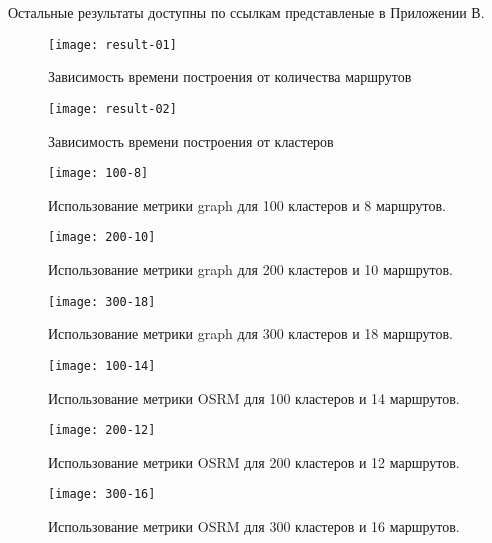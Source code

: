 Остальные результаты доступны по ссылкам представленые в Приложении В.

\begin{figure}[ht!]
    \centering
    \texttt{[image: result-01]}
    \caption{Зависимость времени построения от количества маршрутов}
    \label{fig:result-01}
\end{figure}

\begin{figure}[ht!]
    \centering
    \texttt{[image: result-02]}
    \caption{Зависимость времени построения от кластеров}
    \label{fig:result-02}
\end{figure}

\begin{figure}[ht!]
    \centering
    \texttt{[image: 100-8]}
    \caption{Использование метрики graph для 100 кластеров и 8 маршрутов.}
    \label{fig:network-01a}
\end{figure}

\begin{figure}[ht!]
    \centering
    \texttt{[image: 200-10]}
    \caption{Использование метрики graph для 200 кластеров и 10 маршрутов.}
    \label{fig:network-01b}
\end{figure}

\begin{figure}[ht!]
    \centering
    \texttt{[image: 300-18]}
    \caption{Использование метрики graph для 300 кластеров и 18 маршрутов.}
    \label{fig:network-01c}
\end{figure}

\begin{figure}[ht!]
    \centering
    \texttt{[image: 100-14]}
    \caption{Использование метрики OSRM для 100 кластеров и 14 маршрутов.}
    \label{fig:network-02a}
\end{figure}

\begin{figure}[ht!]
    \centering
    \texttt{[image: 200-12]}
    \caption{Использование метрики OSRM для 200 кластеров и 12 маршрутов.}
    \label{fig:network-02b}
\end{figure}

\begin{figure}[ht!]
    \centering
    \texttt{[image: 300-16]}
    \caption{Использование метрики OSRM для 300 кластеров и 16 маршрутов.}
    \label{fig:network-02c}
\end{figure}


